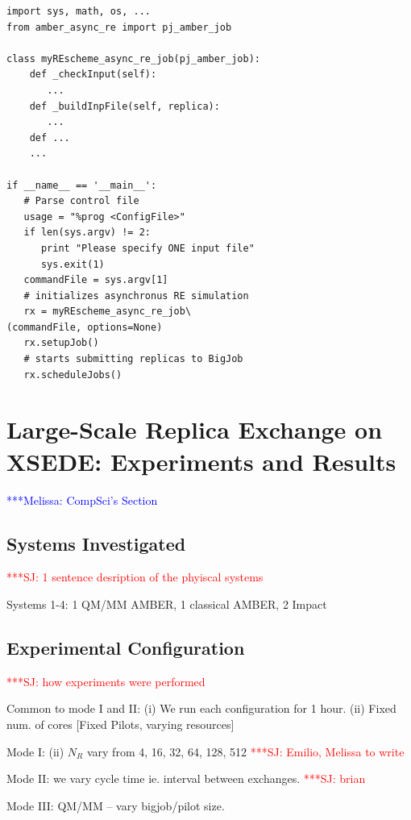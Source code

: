 \documentclass{sig-alternate}
\newcommand{\jhanote}[1]{ {\textcolor{red} { ***SJ: #1 }}}
\newcommand{\mrnote}[1]{ {\textcolor{blue} { ***Melissa: #1 }}}
\newcommand{\jhanote}[1]{}
\begin{document}
\begin{lstlisting}[frame=single]
import sys, math, os, ...
from amber_async_re import pj_amber_job

class myREscheme_async_re_job(pj_amber_job):
    def _checkInput(self):
       ...
    def _buildInpFile(self, replica):
       ...
    def ...
    ...

if __name__ == '__main__':
   # Parse control file
   usage = "%prog <ConfigFile>"
   if len(sys.argv) != 2:
      print "Please specify ONE input file"
      sys.exit(1)    
   commandFile = sys.argv[1]
   # initializes asynchronus RE simulation
   rx = myREscheme_async_re_job\
(commandFile, options=None)
   rx.setupJob()
   # starts submitting replicas to BigJob
   rx.scheduleJobs()
\end{lstlisting}





\section{Large-Scale Replica Exchange on XSEDE: Experiments and
  Results}\label{sec:results}
\mrnote{ CompSci's Section}

\subsection{Systems Investigated} 

\jhanote{1 sentence desription of the phyiscal systems}

Systems 1-4: 1 QM/MM AMBER, 1 classical AMBER, 2 Impact

\subsection{Experimental Configuration}
\jhanote{how experiments were performed} 

Common to mode I and II: (i) We run each configuration for 1 hour.
(ii) Fixed num. of cores [Fixed Pilots, varying resources]

Mode I: (ii) $N_R$ vary from 4, 16, 32, 64, 128, 512 \jhanote{Emilio,
 Melissa to write}


Mode II:  we vary cycle time ie. interval between exchanges. \jhanote{brian}


Mode III: QM/MM -- vary bigjob/pilot size.
\end{document}
